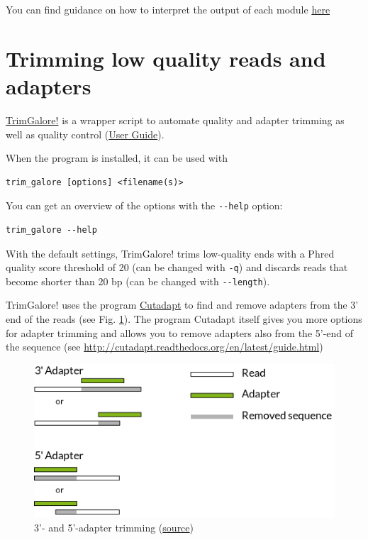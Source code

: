 \documentclass[11pt]{article}
\begin{document}
You can find guidance on how to interpret the output of each module
\href{http://www.bioinformatics.babraham.ac.uk/projects/fastqc/Help/3\%20Analysis\%20Modules/}{here} 

\section{Trimming low quality reads and adapters}
\label{sec-3}
\href{http://www.bioinformatics.babraham.ac.uk/projects/trim_galore/}{TrimGalore!} is a wrapper script to automate quality and adapter
trimming as well as quality control (\href{http://www.bioinformatics.babraham.ac.uk/projects/trim_galore/trim_galore_User_Guide_v0.3.7.pdf}{User Guide}).

When the program is installed, it can be used with 

\begin{verbatim}
trim_galore [options] <filename(s)>
\end{verbatim}

You can get an overview of the options with the \texttt{-{}-help} option:

\begin{verbatim}
trim_galore --help
\end{verbatim}

With the default settings, TrimGalore! trims low-quality ends with a
Phred quality score threshold of 20 (can be changed with \texttt{-q}) and
discards reads that become shorter than 20 bp (can be changed with
\texttt{-{}-length}).

TrimGalore! uses the program \href{https://code.google.com/p/cutadapt/}{Cutadapt} to find and remove adapters from
the 3' end of the reads (see Fig. \ref{fig:adapters}). The program Cutadapt
itself gives you more options for adapter trimming and allows you to
remove adapters also from the 5'-end of the sequence (see
\url{http://cutadapt.readthedocs.org/en/latest/guide.html})

\begin{figure}[htb]
\centering
\includegraphics[width=14cm]{adapters.png}
\caption{\label{fig:adapters}3'- and 5'-adapter trimming (\href{http://cutadapt.readthedocs.org/en/latest/guide.html}{source})}
\end{figure}
\end{document}
